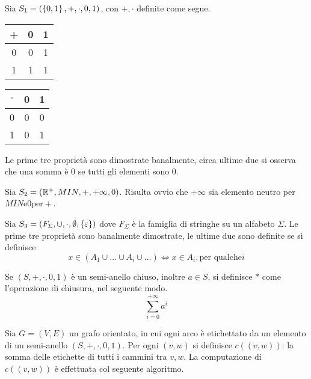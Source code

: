 \documentclass{subfiles}
\begin{document}
\begin{Example*}
    Sia \(S_{1} = (\left\{0, 1\right\}, +, \cdot, 0, 1)\), con \(+, \cdot\) definite come segue.
    \begin{center}
        \begin{tabular}{c|c c}
            + & 0 & 1 \\
            \hline
            0 & 0 & 1 \\
            1 & 1 & 1 \\
        \end{tabular}
        \hspace{25pt}
        \begin{tabular}{c|c c}
            \(\cdot\) & 0 & 1 \\
            \hline
            0         & 0 & 0 \\
            1         & 0 & 1 \\
        \end{tabular}
    \end{center}
    Le prime tre proprietà sono dimostrate banalmente, circa ultime due si osserva che una somma è \(0\) se tutti gli elementi sono \(0\).
\end{Example*}

\begin{Example*}
    Sia \(S_{2} = (\mathbb{R}^{+}, MIN, +, +\infty, 0)\). Risulta ovvio che \(+\infty\) sia elemento neutro per \(MIN \text{e} 0 \text{per} +\).
\end{Example*}

\begin{Example*}
    Sia \(S_{3} = (F_{\Sigma}, \cup, \cdot, \emptyset, \left\{\varepsilon\right\})\) dove \(F_{\Sigma}\) è la famiglia di stringhe su un alfabeto \(\Sigma\).
    Le prime tre proprietà sono banalmente dimostrate, le ultime due sono definite se si definisce
    \[
        x \in (A_{1} \cup \ldots \cup A_{i} \cup \ldots) \iff x \in A_{i}, \text{per qualche}i
    \]
\end{Example*}

\noindent Se \((S, +, \cdot, 0, 1)\) è un semi-anello chiuso, inoltre \(a \in S\), si definisce \(*\) come l'operazione di chiusura, nel seguente modo.
\[
    \sum\limits_{i = 0}^{+\infty}{a^{i}}
\]

\noindent Sia \(G = (V, E)\) un grafo orientato, in cui ogni arco è etichettato da un elemento di un semi-anello \((S, + , \cdot, 0, 1)\).
Per ogni \((v, w)\) si definisce \(c((v, w))\): la somma delle etichette di tutti i cammini tra \(v, w\).
La computazione di \(c((v, w))\) è effettuata col seguente algoritmo.

\end{document}
